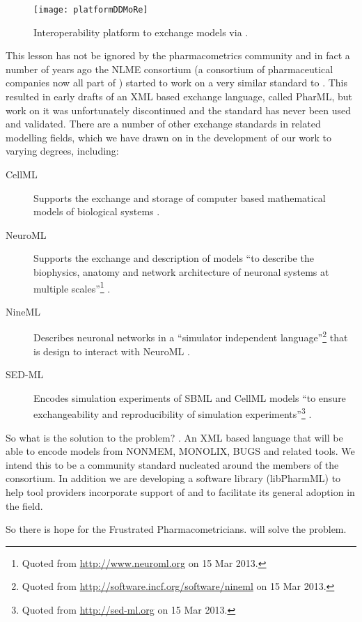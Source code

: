 \begin{figure}[htb]
\centering
  \texttt{[image: platformDDMoRe]}
 \caption{Interoperability platform to exchange models via \pharmml.}
 \label{fig:platformDDMoRe}
\end{figure}

This lesson has not be ignored by the pharmacometrics community and in fact a number of years
ago the NLME consortium (a consortium of pharmaceutical companies now all part of \ddmore) started
to work on a very similar standard to \pharmml. This resulted in early drafts of an XML based exchange
language, called PharML, but work on it was unfortunately discontinued and the standard has never been
used and validated. There are a number of other exchange standards in related modelling fields, which we
have drawn on in the development of our work to varying degrees, including:

\begin{description}
\item[CellML] Supports the exchange and storage of computer based mathematical models of biological systems \cite{CELLML}.
\item[NeuroML] Supports the exchange and description of models ``to describe the biophysics, anatomy and network architecture of neuronal systems at multiple scales''\footnote{Quoted from \url{http://www.neuroml.org} on 15 Mar 2013.} \cite{NeuroML}.
\item[NineML] Describes neuronal networks in a ``simulator independent language''\footnote{Quoted from \url{http://software.incf.org/software/nineml} on 15 Mar 2013.} that is design to interact with NeuroML \cite{ninemlspec}.
\item[SED-ML] Encodes simulation experiments of SBML and CellML models ``to ensure exchangeability and reproducibility of simulation experiments''\footnote{Quoted from \url{http://sed-ml.org} on 15 Mar 2013.} \cite{sedmll1v1}.
\end{description}

So what is the solution to the problem? \pharmml. An XML based language that will be able to encode
models from NONMEM, MONOLIX, BUGS and related tools. We intend this to be a community standard nucleated
around the members of the \ddmore consortium. In addition we are developing a software library
(libPharmML) to help tool providers incorporate support of \pharmml and to facilitate its
general adoption in the field.

So there is hope for the Frustrated Pharmacometricians. \pharmml will solve the problem.

